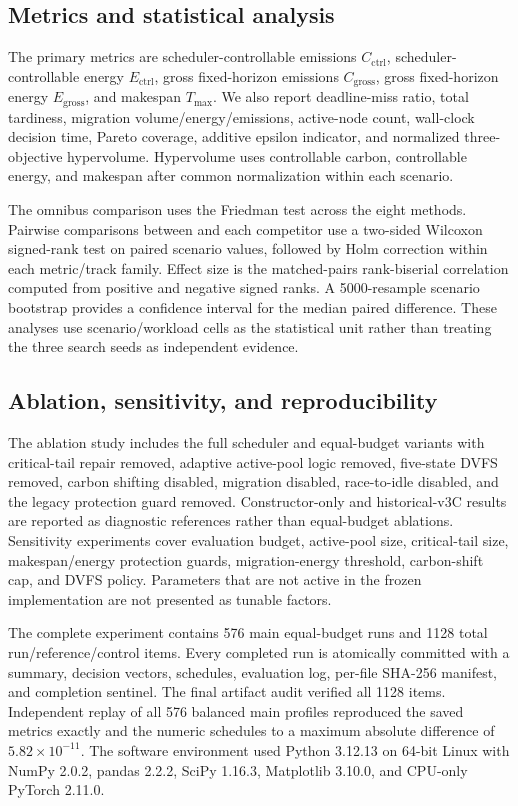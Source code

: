 \subsection{Metrics and statistical analysis}

The primary metrics are scheduler-controllable emissions $C_{\mathrm{ctrl}}$, scheduler-controllable energy $E_{\mathrm{ctrl}}$, gross fixed-horizon emissions $C_{\mathrm{gross}}$, gross fixed-horizon energy $E_{\mathrm{gross}}$, and makespan $T_{\max}$. We also report deadline-miss ratio, total tardiness, migration volume/energy/emissions, active-node count, wall-clock decision time, Pareto coverage, additive epsilon indicator, and normalized three-objective hypervolume. Hypervolume uses controllable carbon, controllable energy, and makespan after common normalization within each scenario.

The omnibus comparison uses the Friedman test across the eight methods. Pairwise comparisons between \method and each competitor use a two-sided Wilcoxon signed-rank test on paired scenario values, followed by Holm correction within each metric/track family. Effect size is the matched-pairs rank-biserial correlation computed from positive and negative signed ranks. A 5000-resample scenario bootstrap provides a confidence interval for the median paired difference. These analyses use scenario/workload cells as the statistical unit rather than treating the three search seeds as independent evidence.

\subsection{Ablation, sensitivity, and reproducibility}

The ablation study includes the full scheduler and equal-budget variants with critical-tail repair removed, adaptive active-pool logic removed, five-state DVFS removed, carbon shifting disabled, migration disabled, race-to-idle disabled, and the legacy protection guard removed. Constructor-only and historical-v3C results are reported as diagnostic references rather than equal-budget ablations. Sensitivity experiments cover evaluation budget, active-pool size, critical-tail size, makespan/energy protection guards, migration-energy threshold, carbon-shift cap, and DVFS policy. Parameters that are not active in the frozen implementation are not presented as tunable factors.

The complete experiment contains 576 main equal-budget runs and 1128 total run/reference/control items. Every completed run is atomically committed with a summary, decision vectors, schedules, evaluation log, per-file SHA-256 manifest, and completion sentinel. The final artifact audit verified all 1128 items. Independent replay of all 576 balanced main profiles reproduced the saved metrics exactly and the numeric schedules to a maximum absolute difference of $5.82\times10^{-11}$. The software environment used Python 3.12.13 on 64-bit Linux with NumPy 2.0.2, pandas 2.2.2, SciPy 1.16.3, Matplotlib 3.10.0, and CPU-only PyTorch 2.11.0.
